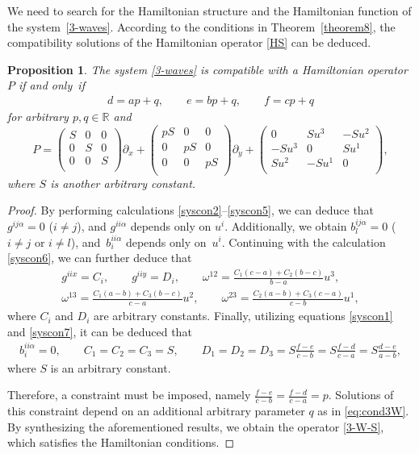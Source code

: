 \documentclass[pdftex]{sigma}
\numberwithin{equation}{section}
\newtheorem{Proposition}[Theorem]{Proposition}
 { \theoremstyle{definition}
\newtheorem{Definition}[Theorem]{Definition}
\newtheorem{Note}[Theorem]{Note}
\newtheorem{Example}[Theorem]{Example}
\newtheorem{Remark}[Theorem]{Remark} }
\begin{document}
We need to search for the Hamiltonian structure and the Hamiltonian function of the system~\eqref{3-waves}. According to the conditions in Theorem~\ref{theorem8}, the compatibility solutions of the Hamiltonian operator \eqref{HS} can be deduced.
\begin{Proposition}\label{prop:3W}
The system \eqref{3-waves} is compatible with a Hamiltonian operator $P$ if and only~if%
\begin{align} \label{eq:cond3W}
d=a p + q,\qquad e=b p+q,\qquad f=cp+q
\end{align}
for arbitrary $p, q \in \mathbb{R}$ and
\begin{equation}\label{3-W-S}
P=\begin{pmatrix} S&0&0\\0&S&0\\0&0&S\\ \end{pmatrix} \partial_x+\begin{pmatrix} pS&0&0\\0&pS&0\\0&0&pS\\ \end{pmatrix} \partial_y+\begin{pmatrix} 0&Su^3&-Su^2\\-Su^3&0&Su^1\\Su^2&-Su^1&0\\ \end{pmatrix},
\end{equation}
where $S$ is another arbitrary constant.
\end{Proposition}
\begin{proof}
By performing calculations \eqref{syscon2}--\eqref{syscon5}, we can deduce that $g^{ij\alpha}=0$ ($i\neq j$), and $g^{ii\alpha}$ depends only on $u^i$. Additionally, we obtain $b^{ij\alpha}_l = 0$ ($i\neq j$ or $i\neq l$), and~$b^{ii\alpha}_i$ depends only on~$u^i$. Continuing with the calculation \eqref{syscon6}, we can further deduce that
\begin{gather*}
g^{iix}=C_i,\qquad g^{iiy}=D_i,\qquad
\omega^{12}=\frac{C_1(c-a)+C_2(b-c)}{b-a}u^3,\\
\omega^{13}=\frac{C_1(a-b)+C_3(b-c)}{c-a}u^2,\qquad
\omega^{23}=\frac{C_2(a-b)+C_3(c-a)}{c-b}u^1,
\end{gather*}
where $C_i$ and $D_i$ are arbitrary constants.
Finally, utilizing equations \eqref{syscon1} and \eqref{syscon7}, it can be deduced that
\begin{gather*}
b^{ii\alpha}_i=0,\qquad C_1=C_2=C_3=S,\qquad
D_1=D_2=D_3=S\frac{f-e}{c-b}=S\frac{f-d}{c-a}=S\frac{d-e}{a-b},
\end{gather*}
where $S$ is an arbitrary constant.

Therefore, a constraint must be imposed, namely
$
\frac{f-e}{c-b}=\frac{f-d}{c-a}=p$.
Solutions of this constraint depend on an additional arbitrary parameter $q$ as in \eqref{eq:cond3W}.
By synthesizing the aforementioned results, we obtain the operator \eqref{3-W-S}, which satisfies the Hamiltonian conditions.
\end{proof}
\end{document}
